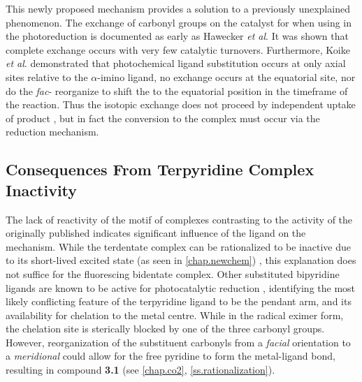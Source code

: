 

This newly proposed mechanism provides a solution to a previously unexplained phenomenon. The exchange of carbonyl groups on the catalyst for  when using  in the photoreduction is documented as early as Hawecker \textit{et al}\autocite{hawecker1986}. It was shown that complete exchange occurs with very few catalytic turnovers. Furthermore, Koike \textit{et al}. demonstrated that photochemical ligand substitution occurs at only axial sites relative to the $\alpha$-imino ligand\autocite{koike2002}, no exchange occurs at the equatorial site, nor do the \textit{fac}- reorganize to shift the  to the equatorial position in the timeframe of the reaction. Thus the isotopic exchange does not proceed by independent uptake of product , but in fact the conversion to the  complex must occur via the reduction mechanism. 

\FloatBarrier

\subsection{Consequences From \texorpdfstring{}{Bidentate} Terpyridine Complex Inactivity}

The  lack of reactivity of the  motif of complexes contrasting to the activity of the originally published  indicates significant influence of the ligand on the mechanism. While the terdentate complex can be rationalized to be inactive due to its short-lived excited state (as seen in \autoref{chap.newchem}) \autocite{shavaleev2004}, this explanation does not suffice for the fluorescing bidentate complex. Other substituted bipyridine ligands are known to be active for photocatalytic reduction \autocite{hawecker1986, kurz2006}, identifying the most likely conflicting feature of the terpyridine ligand to be the pendant arm, and its availability for chelation to the metal centre. While in the radical eximer form, the chelation site is sterically blocked by one of the three carbonyl groups. However, reorganization of the substituent carbonyls from a \textit{facial} orientation to a \textit{meridional} could allow for the free pyridine to form the metal-ligand bond, resulting in compound \textbf{3.1} (see \autoref{chap.co2}, \autoref{ss.rationalization}).

